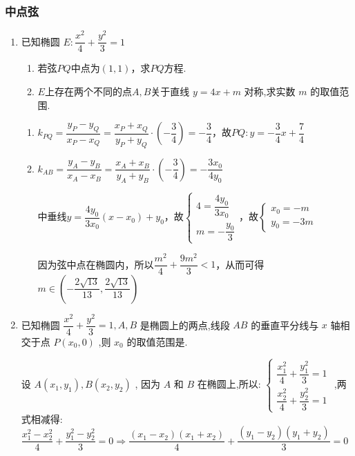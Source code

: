 \subsubsection*{中点弦}
\begin{enumerate}
    \item 已知椭圆 $E: \dfrac{{x}^{2}}{4} + \dfrac{{y}^{2}}{3} = 1$
    \begin{enumerate}
        \item 若弦$PQ$中点为$(1,1)$，求$PQ$方程.
        \item $E$上存在两个不同的点$A, B$关于直线 $y = {4x} + m$ 对称,求实数 $m$ 的取值范围.
    \end{enumerate}
    
    \begin{jieda}
        \begin{enumerate}
            \item $k_{PQ} = \dfrac{y_P-y_Q}{x_P - x_Q} = \dfrac{x_P+x_Q}{y_P+y_Q} \cdot \left(-\dfrac{3}{4}\right) = -\dfrac{3}{4}$，故$PQ: y = -\dfrac{3}{4}x+\dfrac{7}{4}$
            \item $k_{AB} = \dfrac{y_A-y_B}{x_A - x_B} = \dfrac{x_A+x_B}{y_A+y_B} \cdot \left(-\dfrac{3}{4}\right) = -\dfrac{3x_0}{4y_0}$

            中垂线$y = \dfrac{4y_0}{3x_0}(x-x_0)+y_0$，故$\left\{\begin{array}{l}
                4 = \dfrac{4y_0}{3x_0} \\
                m = -\dfrac{y_0}{3}
            \end{array}\right.$，故$\left\{\begin{array}{l}
                x_0 = -m \\
                y_0 = -3m
            \end{array}\right.$
            
            因为弦中点在椭圆内，所以$\dfrac{m^2}{4}+\dfrac{9m^2}{3}<1$，从而可得$m\in \left(-\dfrac{2\sqrt{13}}{13},\dfrac{2\sqrt{13}}{13}\right)$
        \end{enumerate}
    \end{jieda}

    \item 已知椭圆 $\dfrac{{x}^{2}}{4} + \dfrac{{y}^{2}}{3} = 1,A,B$ 是椭圆上的两点,线段 ${AB}$ 的垂直平分线与 $x$ 轴相交于点 $P\left( {{x}_{0},0}\right)$ ,则 ${x}_{0}$ 的取值范围是.
    \begin{jieda}
        设 $A\left( {{x}_{1},{y}_{1}}\right) ,B\left( {{x}_{2},{y}_{2}}\right)$ ,
        因为 $A$ 和 $B$ 在椭圆上,所以: $\left\{  \begin{array}{l} \dfrac{{x}_{1}^{2}}{4} + \dfrac{{y}_{1}^{2}}{3} = 1 \\  \dfrac{{x}_{2}^{2}}{4} + \dfrac{{y}_{2}^{2}}{3} = 1 \end{array}\right.$ ,两式相减得:$\dfrac{{x}_{1}^{2} - {x}_{2}^{2}}{4} + \dfrac{{y}_{1}^{2} - {y}_{2}^{2}}{3} = 0 \Longrightarrow  \dfrac{\left( {{x}_{1} - {x}_{2}}\right) \left( {{x}_{1} + {x}_{2}}\right) }{4} + \dfrac{\left( {{y}_{1} - {y}_{2}}\right) \left( {{y}_{1} + {y}_{2}}\right) }{3} = 0$


\end{jieda}
\end{enumerate}

